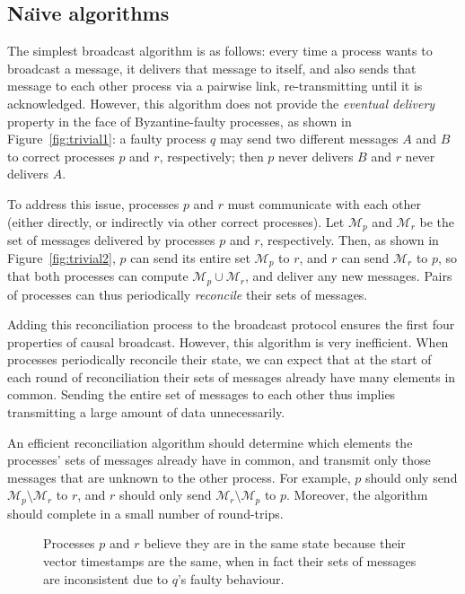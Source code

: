 \documentclass[a4paper,anonymous,USenglish]{lipics-v2019}
\begin{document}
\subsection{Na\"{\i}ve algorithms}

The simplest broadcast algorithm is as follows: every time a process wants to broadcast a message, it delivers that message to itself, and also sends that message to each other process via a pairwise link, re-transmitting until it is acknowledged.
However, this algorithm does not provide the \emph{eventual delivery} property in the face of Byzantine-faulty processes, as shown in Figure~\ref{fig:trivial1}: a faulty process $q$ may send two different messages $A$ and $B$ to correct processes $p$ and $r$, respectively; then $p$ never delivers $B$ and $r$ never delivers $A$.

To address this issue, processes $p$ and $r$ must communicate with each other (either directly, or indirectly via other correct processes).
Let $\mathcal{M}_p$ and $\mathcal{M}_r$ be the set of messages delivered by processes $p$ and $r$, respectively.
Then, as shown in Figure~\ref{fig:trivial2}, $p$ can send its entire set $\mathcal{M}_p$ to $r$, and $r$ can send $\mathcal{M}_r$ to $p$, so that both processes can compute $\mathcal{M}_p \cup \mathcal{M}_r$, and deliver any new messages.
Pairs of processes can thus periodically \emph{reconcile} their sets of messages.

Adding this reconciliation process to the broadcast protocol ensures the first four properties of causal broadcast.
However, this algorithm is very inefficient.
When processes periodically reconcile their state, we can expect that at the start of each round of reconciliation their sets of messages already have many elements in common.
Sending the entire set of messages to each other thus implies transmitting a large amount of data unnecessarily.

An efficient reconciliation algorithm should determine which elements the processes' sets of messages already have in common, and transmit only those messages that are unknown to the other process.
For example, $p$ should only send $\mathcal{M}_p \setminus \mathcal{M}_r$ to $r$, and $r$ should only send $\mathcal{M}_r \setminus \mathcal{M}_p$ to $p$.
Moreover, the algorithm should complete in a small number of round-trips.

\begin{figure}
    \centering
    
    \caption{Processes $p$ and $r$ believe they are in the same state because their vector timestamps are the same, when in fact their sets of messages are inconsistent due to $q$'s faulty behaviour.}
    \label{fig:vectorclocks}
\end{figure}
\end{document}
